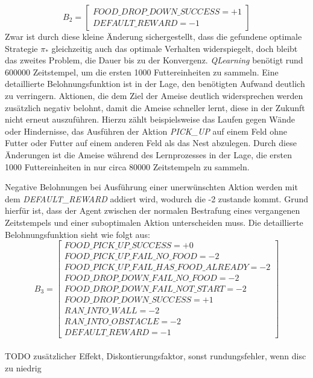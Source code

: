 \begin{equation}
    B_{2} =  \begin{bmatrix} 
        FOOD\_DROP\_DOWN\_SUCCESS = +1\\
        DEFAULT\_REWARD = -1          
 \end{bmatrix}
\end{equation}
Zwar ist durch diese kleine Änderung sichergestellt, dass die gefundene optimale Strategie $\pi_*$ gleichzeitig auch das optimale Verhalten widerspiegelt, doch bleibt das zweites Problem, die Dauer bis zu der Konvergenz. \textit{QLearning} benötigt rund $600000$ Zeitstempel, um die ersten 1000 Futtereinheiten zu sammeln. Eine detaillierte Belohnungsfunktion ist in der Lage, den benötigten Aufwand deutlich zu verringern. Aktionen, die dem Ziel der Ameise deutlich widersprechen werden zusätzlich negativ belohnt, damit die Ameise schneller lernt, diese in der Zukunft nicht erneut auszuführen. Hierzu zählt beispielsweise das Laufen gegen Wände oder Hindernisse, das Ausführen der Aktion \textit{PICK\_UP} auf einem Feld ohne Futter oder Futter auf einem anderen Feld als das Nest abzulegen. Durch diese Änderungen ist die Ameise während des Lernprozesses in der Lage, die ersten 1000 Futtereinheiten in nur circa $80000$ Zeitstempeln zu sammeln. 
\par
Negative Belohnungen bei Ausführung einer unerwünschten Aktion werden mit dem \textit{DEFAULT\_REWARD} addiert wird, wodurch die -2 zustande kommt. Grund hierfür ist, dass der Agent zwischen der normalen \glqq Bestrafung\grqq{} eines vergangenen Zeitstempels und einer suboptimalen Aktion unterscheiden muss. Die detaillierte Belohnungsfunktion sieht wie folgt aus:
\begin{equation}
    B_{3} =  \begin{bmatrix} 
        FOOD\_PICK\_UP\_SUCCESS = +0\\
        FOOD\_PICK\_UP\_FAIL\_NO\_FOOD = -2 \\
        FOOD\_PICK\_UP\_FAIL\_HAS\_FOOD\_ALREADY = -2\\
        FOOD\_DROP\_DOWN\_FAIL\_NO\_FOOD = -2 \\
        FOOD\_DROP\_DOWN\_FAIL\_NOT\_START = -2 \\
        FOOD\_DROP\_DOWN\_SUCCESS = +1\\
        RAN\_INTO\_WALL = -2\\
        RAN\_INTO\_OBSTACLE = -2 \\
        DEFAULT\_REWARD = -1                  
 \end{bmatrix}
\end{equation}
\\ TODO zusätzlicher Effekt, Diskontierungsfaktor, sonst rundungsfehler, wenn disc zu niedrig